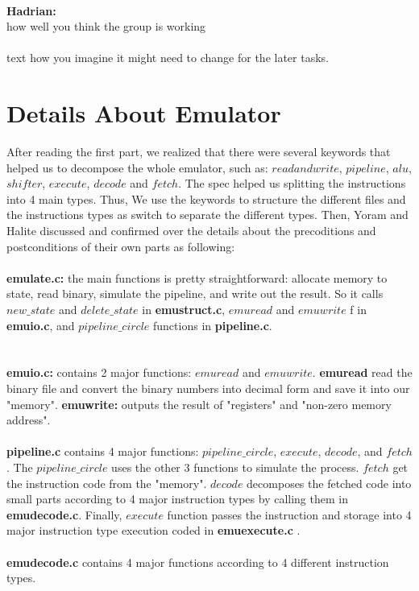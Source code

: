 \documentclass[a4paper]{article}
\begin{document}
\\
\textbf{Hadrian:}\\
 how well you think the group is working
\\\\
text
how you imagine it might need to change for the later tasks.

\section{Details About Emulator}
After reading the first part, we realized that there were several keywords that helped us to decompose the whole emulator, such as: $read and write$, $pipeline$, $alu$, $shifter$, $execute$, $decode$ and $fetch$. The spec helped us splitting the instructions into 4 main types. Thus, We use the keywords to structure the different files and the instructions types as switch to separate the different types. Then, Yoram and Halite discussed and confirmed over the details about the precoditions and postconditions of their own parts as following:
\\\\
\textbf{emulate.c:} the main functions is pretty straightforward: allocate memory to state, read binary, simulate the pipeline, and write out the result. So it calls $new\_state$ and $delete\_state$ in \textbf{emustruct.c}, $emuread$ and $emuwrite$ f in \textbf{emuio.c}, and $pipeline\_circle$ functions in \textbf{pipeline.c}.\\
\\\\
\textbf{emuio.c:} contains 2 major functions: $emuread$ and $emuwrite$. \textbf{emuread} read the binary file and convert the binary numbers into decimal form and save it into our "memory".
\textbf{emuwrite:} outputs the result of "registers" and "non-zero memory address".
\\\\
\textbf{pipeline.c} contains 4 major functions: $pipeline\_circle$, $execute$, $decode$, and $fetch$. The $pipeline\_circle$ uses the other 3 functions to simulate the process. $fetch$ get the instruction code from the "memory". $decode$ decomposes the fetched code into small parts according to 4 major instruction types by calling them in \textbf{emudecode.c}. Finally, $execute$ function passes the instruction and storage into 4 major instruction type execution coded in \textbf{emuexecute.c} .
\\\\
\textbf{emudecode.c} contains 4 major functions according to 4 different instruction types.
\end{document}
